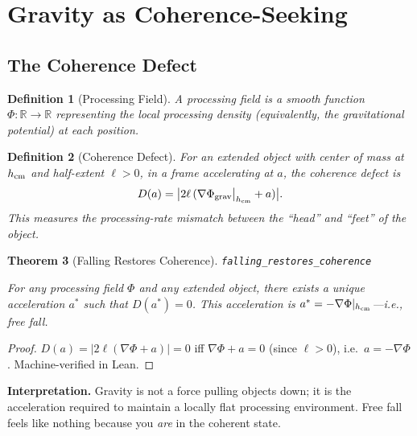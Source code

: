 \documentclass[11pt,a4paper]{article}
\newtheorem{theorem}{Theorem}[section]
\newtheorem{definition}[theorem]{Definition}
\newcommand{\lean}[1]{\texttt{\small #1}}
\begin{document}
\section{Gravity as Coherence-Seeking}
\label{sec:coherence-fall}

\subsection{The Coherence Defect}

\begin{definition}[Processing Field]
A \emph{processing field} is a smooth function $\Phi : \mathbb{R} \to \mathbb{R}$ representing the local processing density (equivalently, the gravitational potential) at each position.
\end{definition}

\begin{definition}[Coherence Defect]
For an extended object with center of mass at $h_{\rm cm}$ and half-extent $\ell > 0$, in a frame accelerating at $a$, the \emph{coherence defect} is
\begin{equation}\label{eq:defect}
    D(a) = \bigl|2\ell\,(\nabla\Phi_{\rm grav}\big|_{h_{\rm cm}} + a)\bigr|.
\end{equation}
This measures the processing-rate mismatch between the ``head'' and ``feet'' of the object.
\end{definition}

\begin{theorem}[Falling Restores Coherence]
\label{thm:falling}
\lean{falling\_restores\_coherence}

For any processing field $\Phi$ and any extended object, there exists a unique acceleration $a^*$ such that $D(a^*) = 0$.
This acceleration is $a^* = -\nabla\Phi|_{h_{\rm cm}}$---i.e., free fall.
\end{theorem}

\begin{proof}
$D(a) = |2\ell(\nabla\Phi + a)| = 0$ iff $\nabla\Phi + a = 0$ (since $\ell > 0$), i.e.\ $a = -\nabla\Phi$.
Machine-verified in Lean.
\end{proof}

\noindent\textbf{Interpretation.} Gravity is not a force pulling objects down; it is the acceleration required to maintain a locally flat processing environment.
Free fall feels like nothing because you \emph{are} in the coherent state.
\end{document}
